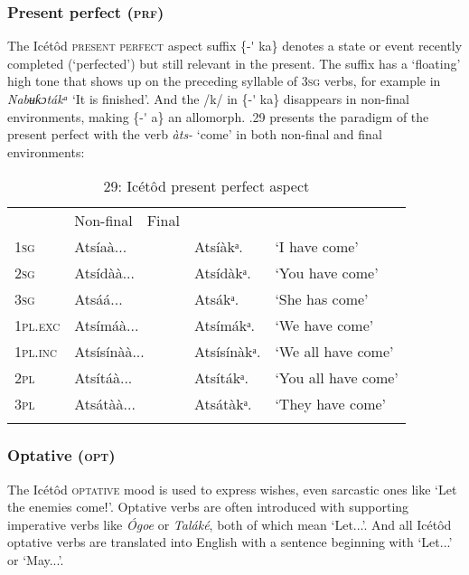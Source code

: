 \subsubsection{Present perfect (\textsc{prf})}

The Icétôd \textsc{present perfect} aspect suffix \{-\'{} ka\} denotes a state or event recently completed (‘perfected’) but still relevant in the present. The suffix has a ‘floating’ high tone that shows up on the preceding syllable of 3\textsc{sg} verbs, for example in \textit{Nabʉƙɔtákᵃ} ‘It is finished’. And the /k/ in \{-\'{} ka\} disappears in non-final environments, making \{-\'{} a\} an allomorph. .29 presents the paradigm of the present perfect with the verb \textit{àts-} ‘come’ in both non-final and final environments:


\begin{table}
\caption{29: Icétôd present perfect aspect}
\label{tab:8}


\begin{tabularx}{\textwidth}{XXXXX}
\lsptoprule

\multicolumn{2}{X}{} & Non-final & Final & \\
\textsc{1sg} & \multicolumn{2}{X}{Atsíaà...} & Atsíàkᵃ. & ‘I have come’\\
\textsc{2sg} & \multicolumn{2}{X}{Atsídàà...} & Atsídàkᵃ. & ‘You have come’\\
\textsc{3sg} & \multicolumn{2}{X}{Atsáá...} & Atsákᵃ. & ‘She has come’\\
\textsc{1pl.exc} & \multicolumn{2}{X}{Atsímáà...} & Atsímákᵃ. & ‘We have come’\\
\textsc{1pl.inc} & \multicolumn{2}{X}{Atsísínàà...} & Atsísínàkᵃ. & ‘We all have come’\\
\textsc{2pl} & \multicolumn{2}{X}{Atsítáà...} & Atsítákᵃ. & ‘You all have come’\\
\textsc{3pl} & \multicolumn{2}{X}{Atsátàà...} & Atsátàkᵃ. & ‘They have come’\\
\lspbottomrule
\end{tabularx}
\end{table}

\subsubsection{Optative (\textsc{opt})}

The Icétôd \textsc{optative} mood is used to express wishes, even sarcastic ones like ‘Let the enemies comeǃ’. Optative verbs are often introduced with supporting imperative verbs like \textit{\'{O}goe} or \textit{Taláké}, both of which mean ‘Let...’. And all Icétôd optative verbs are translated into English with a sentence beginning with ‘Let...’ or ‘May...’. 

